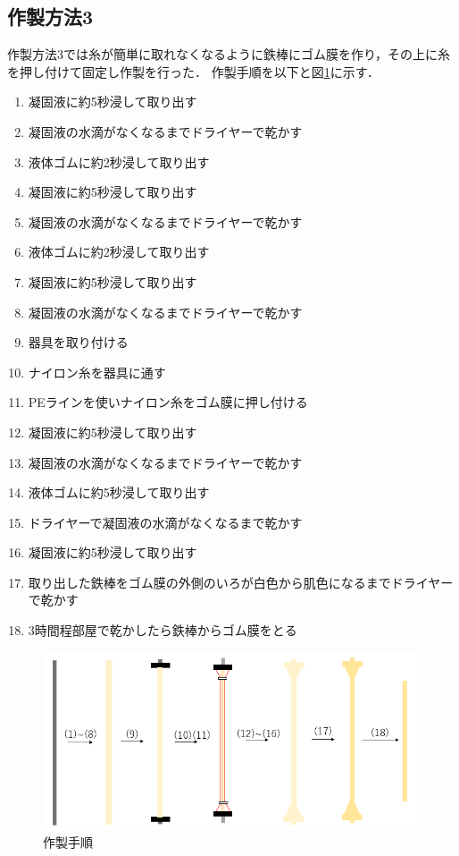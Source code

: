 \subsection{作製方法3}
作製方法3では糸が簡単に取れなくなるように鉄棒にゴム膜を作り，その上に糸を押し付けて固定し作製を行った．
作製手順を以下と図\ref{fig:24}に示す．
\begin{enumerate}
  \item 凝固液に約5秒浸して取り出す
  \item 凝固液の水滴がなくなるまでドライヤーで乾かす
  \item 液体ゴムに約2秒浸して取り出す
  \item 凝固液に約5秒浸して取り出す
  \item 凝固液の水滴がなくなるまでドライヤーで乾かす
  \item 液体ゴムに約2秒浸して取り出す
  \item 凝固液に約5秒浸して取り出す
  \item 凝固液の水滴がなくなるまでドライヤーで乾かす
  \item 器具を取り付ける
  \item ナイロン糸を器具に通す
  \item PEラインを使いナイロン糸をゴム膜に押し付ける
  \item 凝固液に約5秒浸して取り出す
  \item 凝固液の水滴がなくなるまでドライヤーで乾かす
  \item 液体ゴムに約5秒浸して取り出す
  \item ドライヤーで凝固液の水滴がなくなるまで乾かす
  \item 凝固液に約5秒浸して取り出す
  \item 取り出した鉄棒をゴム膜の外側のいろが白色から肌色になるまでドライヤーで乾かす
  \item 3時間程部屋で乾かしたら鉄棒からゴム膜をとる
\end{enumerate}
\begin{figure}[h]
  \centering  %
  \includegraphics[scale=0.4]{pic/2211.PNG}
  \caption{作製手順}
  \label{fig:24}
\end{figure}
